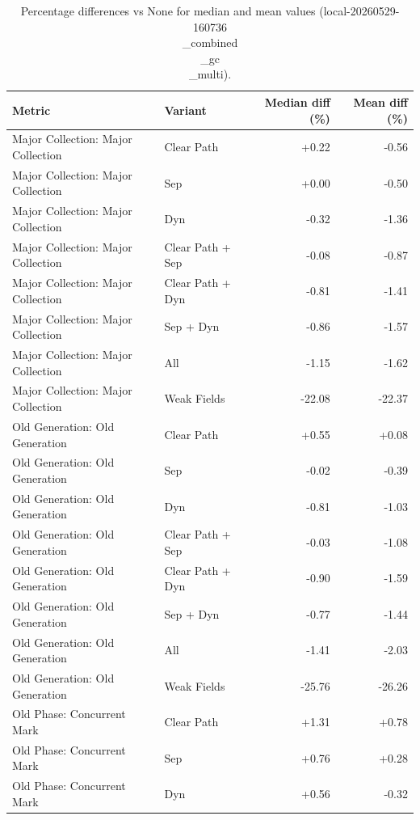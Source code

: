 \begin{table}[t]
\centering
\caption{Percentage differences vs None for median and mean values (local-20260529-160736\\_combined\\_gc\\_multi).}
\label{tab:gc_metric_pct_diff_local-20260529-160736\\_combined\\_gc\\_multi}
\begin{tabular}{llrr}
\toprule
Metric & Variant & Median diff (\%) & Mean diff (\%) \\
\midrule
Major Collection: Major Collection & Clear Path & +0.22 & -0.56 \\
Major Collection: Major Collection & Sep & +0.00 & -0.50 \\
Major Collection: Major Collection & Dyn & -0.32 & -1.36 \\
Major Collection: Major Collection & Clear Path + Sep & -0.08 & -0.87 \\
Major Collection: Major Collection & Clear Path + Dyn & -0.81 & -1.41 \\
Major Collection: Major Collection & Sep + Dyn & -0.86 & -1.57 \\
Major Collection: Major Collection & All & -1.15 & -1.62 \\
Major Collection: Major Collection & Weak Fields & -22.08 & -22.37 \\
Old Generation: Old Generation & Clear Path & +0.55 & +0.08 \\
Old Generation: Old Generation & Sep & -0.02 & -0.39 \\
Old Generation: Old Generation & Dyn & -0.81 & -1.03 \\
Old Generation: Old Generation & Clear Path + Sep & -0.03 & -1.08 \\
Old Generation: Old Generation & Clear Path + Dyn & -0.90 & -1.59 \\
Old Generation: Old Generation & Sep + Dyn & -0.77 & -1.44 \\
Old Generation: Old Generation & All & -1.41 & -2.03 \\
Old Generation: Old Generation & Weak Fields & -25.76 & -26.26 \\
Old Phase: Concurrent Mark & Clear Path & +1.31 & +0.78 \\
Old Phase: Concurrent Mark & Sep & +0.76 & +0.28 \\
Old Phase: Concurrent Mark & Dyn & +0.56 & -0.32 \\

\end{tabular}
\end{table}
